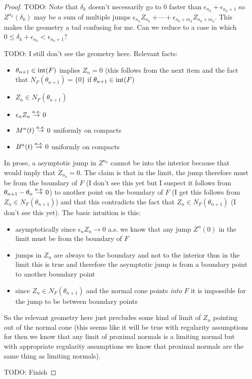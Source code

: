 \begin{proof}
TODO: Note that $\delta_k$ doesn't necessarily go to 0 faster than $\epsilon_{n_k} + \epsilon_{n_k + 1}$ so $Z^{n_k}(\delta_k)$ may be a sum of multiple jumps $\epsilon_{n_k} Z_{n_k} + \dotsb + \epsilon_{n_k + m_k} Z_{n_k + m_k}$.  This makes the geometry a tad confusing for me.  Can we reduce to a case in which $0 \leq \delta_k + \epsilon_{n_k} < \epsilon_{n_k+1}$?


TODO: I still don't see the geometry here.  Relevant facts: 
\begin{itemize}
\item $\theta_{n+1} \in \operatorname*{int}(F)$ implies $Z_n = 0$ (this follows from the next item and the fact that $N_F(\theta_{n+1}) = \lbrace 0 \rbrace$ if $\theta_{n+1} \in \operatorname*{int}(F)$
\item $Z_n \in N_F(\theta_{n+1})$
\item $\epsilon_n Z_n \overset{a.s.}\to 0$
\item $M^n(t) \overset{a.s.}\to 0$ uniformly on compacts
\item $B^n(t) \overset{a.s.}\to 0$ uniformly on compacts
\end{itemize}
In prose, a asymptotic jump in $Z^{n_k}$ cannot be into the interior because that would imply that $Z_{n_k} = 0$.  The claim is that in the limit, the jump therefore must be from the boundary of $F$ (I don't see this yet but I suspect it follows from $\theta_{n+1} - \theta_n \overset{a.s.}\to 0$) to another point on the boundary of $F$ (I get this follows from $Z_n \in N_F(\theta_{n+1})$) and that this contradicts the fact that $Z_n \in N_F(\theta_{n+1})$ (I don't see this yet).  The basic intuition is this: 
\begin{itemize}
\item asymptotically since $\epsilon_n Z_n \to 0$ a.s. we know that any jump $Z^n(0)$ in the limit must be from the boundary of $F$
\item jumps in $Z_n$ are always to the boundary and not to the interior thus in the limit this is true and therefore the asymptotic jump is from a boundary point to another boundary point
\item since $Z_n \in N_F(\theta_{n+1})$ and the normal cone points \emph{into} $F$ it is impossible for the jump to be between boundary points
\end{itemize}
So the relevant geometry here just precludes some kind of limit of $Z_n$ pointing out of the normal cone (this seems like it will be true with regularity assumptions for then we know that any limit of proximal normals is a limiting normal but with appropriate regularity assumptions we know that proximal normals are the same thing as limiting normals).

TODO: Finish
\end{proof}


